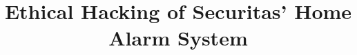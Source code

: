 \documentclass[english]{kththesis}
\title{Ethical Hacking of Securitas' Home Alarm System}
\begin{document}

\label{pg:lastPageofPreface}

\mainmatter









\printbibliography[title=References]

\appendix
\renewcommand{\chaptermark}[1]{\markboth{Appendix \thechapter\relax:\thinspace\relax#1}{}}

\end{document}
